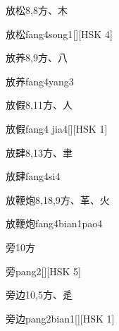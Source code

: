 \begin{entry}{放松}{8,8}{⽅、⽊}
  \begin{phonetics}{放松}{fang4song1}[][HSK 4]
  \end{phonetics}
\end{entry}

\begin{entry}{放养}{8,9}{⽅、⼋}
  \begin{phonetics}{放养}{fang4yang3}
  \end{phonetics}
\end{entry}

\begin{entry}{放假}{8,11}{⽅、⼈}
  \begin{phonetics}{放假}{fang4 jia4}[][HSK 1]
  \end{phonetics}
\end{entry}

\begin{entry}{放肆}{8,13}{⽅、⾀}
  \begin{phonetics}{放肆}{fang4si4}
  \end{phonetics}
\end{entry}

\begin{entry}{放鞭炮}{8,18,9}{⽅、⾰、⽕}
  \begin{phonetics}{放鞭炮}{fang4bian1pao4}
  \end{phonetics}
\end{entry}

\begin{entry}{旁}{10}{⽅}
  \begin{phonetics}{旁}{pang2}[][HSK 5]
  \end{phonetics}
\end{entry}

\begin{entry}{旁边}{10,5}{⽅、⾡}
  \begin{phonetics}{旁边}{pang2bian1}[][HSK 1]
  \end{phonetics}
\end{entry}

